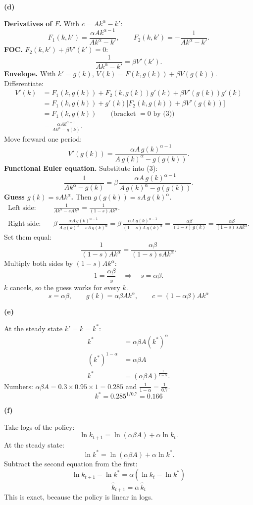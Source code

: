 \documentclass[12pt]{article}
\newcommand{\pt}[1]{\par\bigskip\textbf{(#1)}\par}
\newcommand{\ans}[1]{\[\boxed{\ #1\ }\]}
\begin{document}
\pt{d}
\textbf{Derivatives of $F$.} With $c=Ak^\alpha-k'$:
\[
F_1(k,k')=\frac{\alpha Ak^{\alpha-1}}{Ak^\alpha-k'},\qquad F_2(k,k')=-\frac{1}{Ak^\alpha-k'}.
\]
\textbf{FOC.} $F_2(k,k')+\beta V'(k')=0$:
\[
\frac{1}{Ak^\alpha-k'}=\beta V'(k').\tag{3}
\]
\textbf{Envelope.} With $k'=g(k)$, $V(k)=F(k,g(k))+\beta V(g(k))$.
Differentiate:
\begin{align*}
V'(k)&=F_1(k,g(k))+F_2(k,g(k))g'(k)+\beta V'(g(k))g'(k)\\
&=F_1(k,g(k))+g'(k)\big[F_2(k,g(k))+\beta V'(g(k))\big]\\
&=F_1(k,g(k))\qquad\text{(bracket $=0$ by (3))}\\
&=\frac{\alpha Ak^{\alpha-1}}{Ak^\alpha-g(k)}.
\end{align*}
Move forward one period:
\[
V'(g(k))=\frac{\alpha A\,g(k)^{\alpha-1}}{A\,g(k)^\alpha-g(g(k))}.
\]
\textbf{Functional Euler equation.} Substitute into (3):
\[
\frac{1}{Ak^\alpha-g(k)}=\beta\,\frac{\alpha A\,g(k)^{\alpha-1}}{A\,g(k)^\alpha-g(g(k))}.
\]
\textbf{Guess $g(k)=sAk^\alpha$.} Then $g(g(k))=sA\,g(k)^\alpha$.
\begin{align*}
\text{Left side:}&\quad\frac{1}{Ak^\alpha-sAk^\alpha}=\frac{1}{(1-s)Ak^\alpha}.\\
\text{Right side:}&\quad\beta\,\frac{\alpha A\,g(k)^{\alpha-1}}{A\,g(k)^\alpha-sA\,g(k)^\alpha}=\beta\,\frac{\alpha A\,g(k)^{\alpha-1}}{(1-s)A\,g(k)^\alpha}=\frac{\alpha\beta}{(1-s)\,g(k)}=\frac{\alpha\beta}{(1-s)\,sAk^\alpha}.
\end{align*}
Set them equal:
\[
\frac{1}{(1-s)Ak^\alpha}=\frac{\alpha\beta}{(1-s)sAk^\alpha}.
\]
Multiply both sides by $(1-s)Ak^\alpha$:
\[
1=\frac{\alpha\beta}{s}\quad\Longrightarrow\quad s=\alpha\beta .
\]
$k$ cancels, so the guess works for every $k$.
\ans{s=\alpha\beta,\qquad g(k)=\alpha\beta Ak^\alpha,\qquad c=(1-\alpha\beta)Ak^\alpha}

\pt{e}
At the steady state $k'=k=k^*$:
\begin{align*}
k^*&=\alpha\beta A(k^*)^\alpha\\
(k^*)^{1-\alpha}&=\alpha\beta A\\
k^*&=(\alpha\beta A)^{\frac{1}{1-\alpha}} .
\end{align*}
Numbers: $\alpha\beta A=0.3\times0.95\times1=0.285$ and
$\frac{1}{1-\alpha}=\frac{1}{0.7}$.
\ans{k^*=0.285^{1/0.7}=0.166}

\pt{f}
Take logs of the policy:
\[
\ln k_{t+1}=\ln(\alpha\beta A)+\alpha\ln k_t .
\]
At the steady state:
\[
\ln k^*=\ln(\alpha\beta A)+\alpha\ln k^* .
\]
Subtract the second equation from the first:
\[
\ln k_{t+1}-\ln k^*=\alpha(\ln k_t-\ln k^*)
\]
\ans{\hat k_{t+1}=\alpha\,\hat k_t}
This is exact, because the policy is linear in logs.
\end{document}
